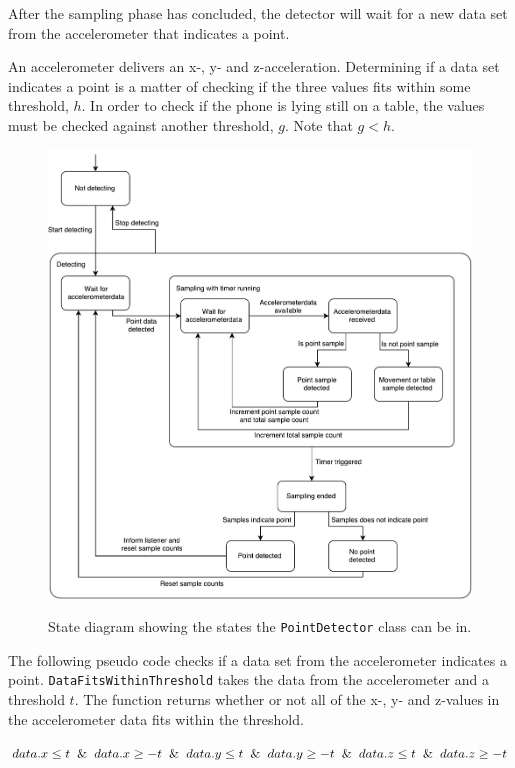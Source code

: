 After the sampling phase has concluded, the detector will wait for a new data set from the accelerometer that indicates a point.

An accelerometer delivers an x-, y- and z-acceleration. Determining if a data set indicates a point is a matter of checking if the three values fits within some threshold, $h$. In order to check if the phone is lying still on a table, the values must be checked against another threshold, $g$. Note that $g < h$.

\begin{figure}
\centering
\includegraphics[width=\textwidth]{images/point-detector-state-diagram}
\label{fig:gesture-recognition:pointdetector-state-diagram}
\caption{State diagram showing the states the \texttt{PointDetector} class can be in.}
\end{figure}

The following pseudo code checks if a data set from the accelerometer indicates a point. \texttt{DataFitsWithinThreshold} takes the data from the accelerometer and a threshold $t$. The function returns whether or not all of the x-, y- and z-values in the accelerometer data fits within the threshold.

\begin{algorithmic}
  \State \Return $data.x \leq t \And data.x \geq -t \And data.y \leq t \And data.y \geq -t \And data.z \leq t \And data.z \geq -t$
\EndFunction
\end{algorithmic}

